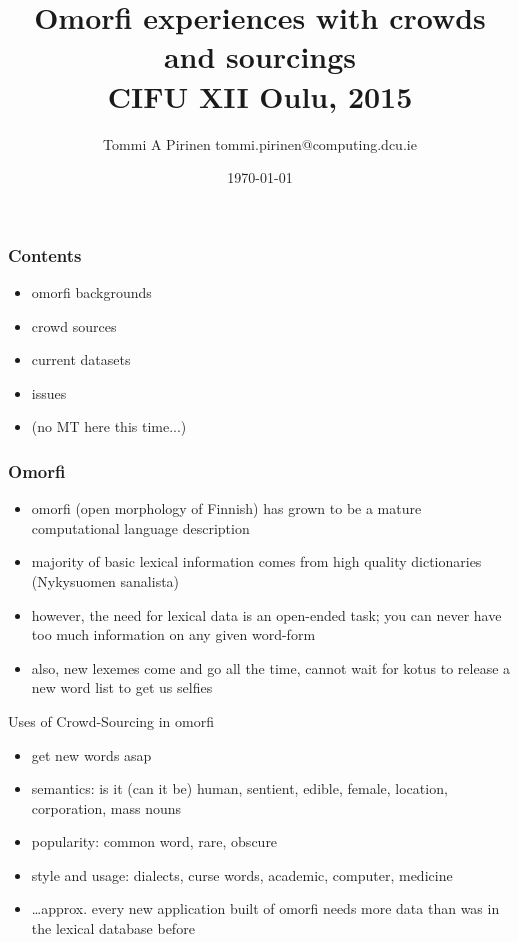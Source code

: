 \documentclass{beamer}
\title{Omorfi experiences with crowds and sourcings\\
\scriptsize{CIFU XII Oulu, 2015}}
\author{Tommi A Pirinen \scriptsize \guilsinglleft{}tommi.pirinen@computing.dcu.ie\guilsinglright{}}
\institute{Ollscoil Chathair Bhaile Átha Cliath, ADAPT Centre\\
EU Marie Curie Abu-MaTran project}
\date{\today}
\begin{document}

\maketitle

\begin{frame}
    \frametitle{Contents}
    \begin{itemize}
        \item omorfi backgrounds
        \item crowd sources
        \item current datasets
        \item issues
        \item (no MT here this time...)
    \end{itemize}
\end{frame}

\begin{frame}
    \frametitle{Omorfi}
    \begin{itemize}
        \item omorfi (open morphology of Finnish) has grown to be a mature
            computational language description
        \item majority of basic lexical information comes from high quality
            dictionaries (Nykysuomen sanalista)
        \item however, the need for lexical data is an open-ended task; you
            can never have too much information on any given word-form
        \item also, new lexemes come and go all the time, cannot wait for
            kotus to release a new word list to get us selfies
    \end{itemize}
\end{frame}

\begin{frame}{Uses of Crowd-Sourcing in omorfi}
    \begin{itemize}
        \item get new words asap
        \item semantics: is it (can it be) human, sentient, edible, female,
            location, corporation, mass nouns
        \item popularity: common word, rare, obscure
        \item style and usage: dialects, curse words, academic, computer,
            medicine
        \item \ldots approx. every new application built of omorfi needs
            more data than was in the lexical database before
    \end{itemize}
\end{frame}
\end{document}
